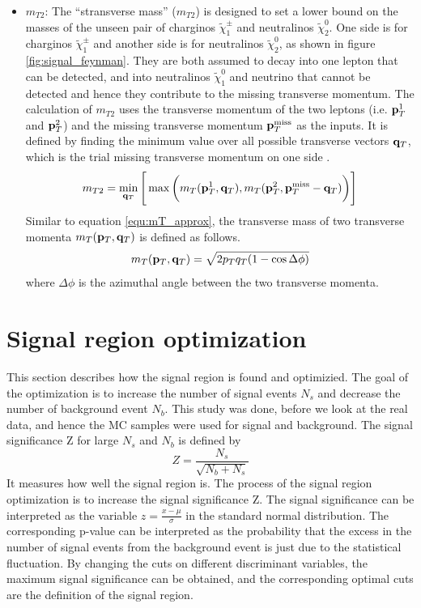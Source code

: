 \begin{itemize}
\item $m_{T2}$:
The ``stransverse mass'' ($m_{T2}$) is designed to set a lower bound on the masses of the unseen pair of charginos $\tilde{\chi}_1^\pm$ and neutralinos $\tilde{\chi}_2^0$.
One side is for charginos $\tilde{\chi}_1^\pm$ and another side is for neutralinos $\tilde{\chi}_2^0$, as shown in figure \ref{fig:signal_feynman}.
They are both assumed to decay into one lepton that can be detected, and into neutralinos $\tilde{\chi}_1^0$ and neutrino that cannot be detected and hence they contribute to the missing transverse momentum.
The calculation of $m_{T2}$ uses the transverse momentum of the two leptons (i.e. ${\bf p}_T^1$ and ${\bf p}_T^2$) and the missing transverse momentum ${\bf p}_T^{\text{miss}}$ as the inputs.
It is defined by finding the minimum value over all possible transverse vectors ${\bf q}_T$, which is the trial missing transverse momentum on one side \cite{MT2}.
\begin{equation}
m_{T2} = \min_{{\bf q}_T} \Bigg[ \max \bigg( m_T( {\bf p}_T^1, {\bf q}_T ), m_T( {\bf p}_T^2, {\bf p}_T^{\text{miss}} - {\bf q}_T ) \bigg) \Bigg]
\end{equation}
Similar to equation \ref{equ:mT_approx}, the transverse mass of two transverse momenta $m_T( {\bf p}_T, {\bf q}_T )$ is defined as follows.
\begin{equation}
m_T( {\bf p}_T, {\bf q}_T ) = \sqrt{ 2 p_T q_T ( 1 - \cos{\Delta\phi} ) }
\end{equation}
where $\Delta\phi$ is the azimuthal angle between the two transverse momenta.
\end{itemize}

\section{Signal region optimization}
\label{sec:signal_region_optimization}
This section describes how the signal region is found and optimizied.
The goal of the optimization is to increase the number of signal events $N_s$ and decrease the number of background event $N_b$.
This study was done, before we look at the real data, and hence the MC samples were used for signal and background.
The signal significance Z for large $N_s$ and $N_b$ is defined by
\begin{equation}
Z = \frac{N_s}{\sqrt{N_b + N_s}}
\label{equ:simple_significance}
\end{equation}
It measures how well the signal region is.
The process of the signal region optimization is to increase the signal significance Z.
The signal significance can be interpreted as the variable $z = \frac{x-\mu}{\sigma}$ in the standard normal distribution.
The corresponding p-value can be interpreted as the probability that the excess in the number of signal events from the background event is just due to the statistical fluctuation.
By changing the cuts on different discriminant variables, the maximum signal significance can be obtained, and the corresponding optimal cuts are the definition of the signal region.

